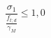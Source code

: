 \documentclass[12pt]{article}
\begin{document}
\begin{displaymath}
\frac {\sigma_1} {\frac {f_{t;d}} {\gamma_M}} \leq 1,0
\end{displaymath}
\end{document}
